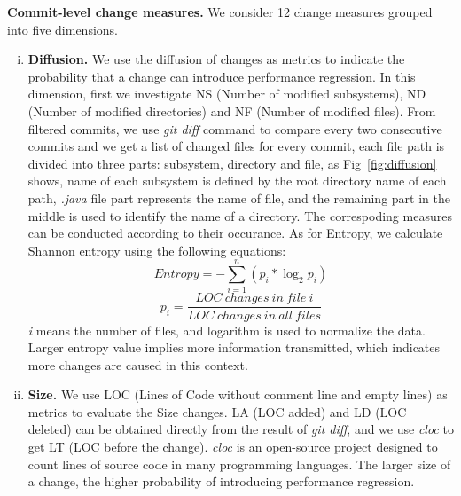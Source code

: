  \textbf{Commit-level change measures.} We consider 12 change measures grouped into five dimensions.
\begin{enumerate}[(i)]
	\item \noindent
	\textbf{Diffusion.} We use the diffusion of changes as metrics to indicate the probability that a change can introduce performance regression. In this dimension, first we investigate NS (Number of modified subsystems), ND (Number of modified directories) and NF (Number of modified files). From filtered commits, we use \textit{git diff} command to compare every two consecutive commits and we get a list of changed files for every commit, each file path is divided into three parts: subsystem, directory and file, as Fig~\ref{fig:diffusion} shows, name of each subsystem is defined by the root directory name of each path, \textit{.java} file part represents the name of file, and the remaining part in the middle is used to identify the name of a directory. The correspoding measures can be conducted according to their occurance. As for Entropy, we calculate Shannon entropy using the following equations:
	\begin{equation}
		Entropy = - \sum_{i=1}^{n}\left (p_{i}\ast \log_2 p_{i} \right )
	\end{equation}
	\begin{equation}
		p_{i} =\frac{LOC\ changes\ in\ file\ i}{LOC\ changes\ in\ all\ files}
	\end{equation}
	\textit{i} means the number of files, and logarithm is used to normalize the data. Larger entropy value implies more information transmitted, which indicates more changes are caused in this context.
	
	\item \noindent
	\textbf{Size.}
	We use LOC (Lines of Code without comment line and empty lines) as metrics to evaluate the Size changes. LA (LOC added) and LD (LOC deleted) can be obtained directly from the result of \textit{git diff}, and we use \textit{cloc} to get LT (LOC before the change). \textit{cloc} is an open-source project designed to count lines of source code in many programming languages. The larger size of a change,  the higher probability of introducing performance regression.
	

\end{enumerate}
